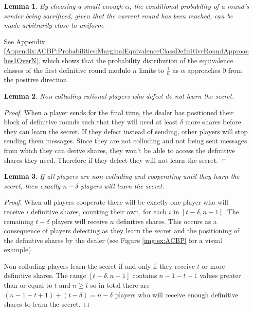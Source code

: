 \documentclass[12pt]{article}
\newtheorem{lemma}{Lemma}
\begin{document}
\begin{lemma}\label{Lem:ACBP:FairerDuringWithSmallAlpha}By choosing a small enough $\alpha$, the conditional probability of a round's sender being sacrificed, given that the current round has been reached, can be made arbitrarily close to uniform.\end{lemma}
See Appendix \ref{Appendix:ACBP:Probabilities:MarginalEquivalenceClassDefinitiveRoundApproaches1OverN}, which shows that the probability distribution of the equivalence classes of the first definitive round modulo $n$ limits to $\frac{1}{n}$ as $\alpha$ approaches $0$ from the positive direction.

\begin{lemma}\label{Lem:ACBP:SoloTemptNone}Non-colluding rational players who defect do not learn the secret.\end{lemma}
\begin{proof}
When a player sends for the final time, the dealer has positioned their block of definitive rounds such that they will need at least $\delta$ more shares before they can learn the secret. If they defect instead of sending, other players will stop sending them messages. Since they are not colluding and not being sent messages from which they can derive shares, they won't be able to access the definitive shares they need. Therefore if they defect they will not learn the secret.
\end{proof}

\begin{lemma}\label{Lem:ACBP:AllDeltaLose}If all players are non-colluding and cooperating until they learn the secret, then exactly $n-\delta$ players will learn the secret.\end{lemma}
\begin{proof}
When all players cooperate there will be exactly one player who will receive $i$ definitive shares, counting their own, for each $i$ in $[t-\delta, n-1]$. The remaining $t-\delta$ players will receive $n$ definitive shares. This occurs as a consequence of players defecting as they learn the secret and the positioning of the definitive shares by the dealer (see Figure \ref{img:ex:ACBP} for a visual example).

Non-colluding players learn the secret if and only if they receive $t$ or more definitive shares. The range $[t-\delta, n-1]$ contains $n-1-t+1$ values greater than or equal to $t$ and $n \geq t$ so in total there are $(n-1-t+1) + (t-\delta) = n-\delta$ players who will receive enough definitive shares to learn the secret.
\end{proof}
\end{document}
